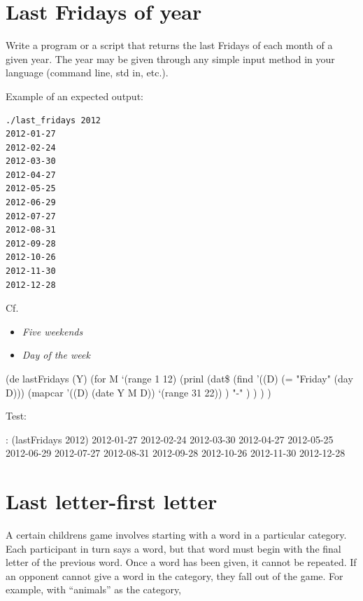 \pagebreak{}
\section*{Last Fridays of year}

Write a program or a script that returns the last Fridays of each month
of a given year. The year may be given through any simple input method
in your language (command line, std in, etc.).

Example of an expected output:

\begin{verbatim}
./last_fridays 2012
2012-01-27
2012-02-24
2012-03-30
2012-04-27
2012-05-25
2012-06-29
2012-07-27
2012-08-31
2012-09-28
2012-10-26
2012-11-30
2012-12-28
\end{verbatim}

\begin{description}
\item[Cf.]
\end{description}

\begin{itemize}
\item
  \emph{Five weekends}
\item
  \emph{Day of the week}
\end{itemize}


\begin{wideverbatim}

(de lastFridays (Y)
   (for M `(range 1 12)
      (prinl
         (dat\$
            (find '((D) (= "Friday" (day D)))
               (mapcar '((D) (date Y M D)) `(range 31 22)) )
            "-" ) ) ) )

Test:

: (lastFridays 2012)
2012-01-27
2012-02-24
2012-03-30
2012-04-27
2012-05-25
2012-06-29
2012-07-27
2012-08-31
2012-09-28
2012-10-26
2012-11-30
2012-12-28

\end{wideverbatim}

\pagebreak{}
\section*{Last letter-first letter}

A certain childrens game involves starting with a word in a particular
category. Each participant in turn says a word, but that word must begin
with the final letter of the previous word. Once a word has been given,
it cannot be repeated. If an opponent cannot give a word in the
category, they fall out of the game. For example, with ``animals'' as
the category,

